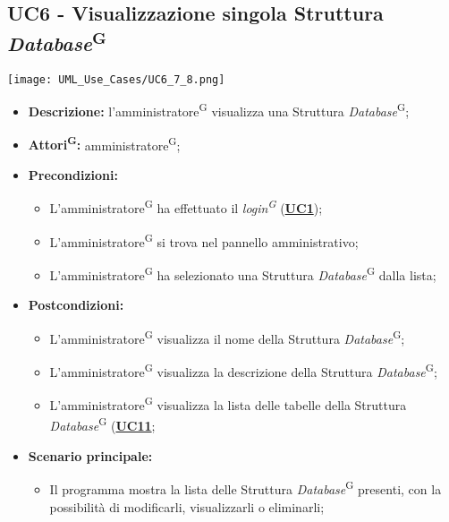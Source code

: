 \subsection{UC6 - Visualizzazione singola Struttura \textit{Database}\textsuperscript{G}}
\label{sec:UC6}
\texttt{[image: UML\_Use\_Cases/UC6\_7\_8.png]}
\begin{itemize}
	\item \textbf{Descrizione:} l’amministratore\textsuperscript{G} visualizza una Struttura \textit{Database}\textsuperscript{G};
	\item \textbf{Attori\textsuperscript{G}:} amministratore\textsuperscript{G};
	\item \textbf{Precondizioni:} 
	\begin{itemize}
		\item L’amministratore\textsuperscript{G} ha effettuato il \textit{login\textsuperscript{G}} (\hyperref[sec:UC1]{\textbf{UC1}});
		\item L’amministratore\textsuperscript{G} si trova nel pannello amministrativo;
		\item L'amministratore\textsuperscript{G} ha selezionato una Struttura \textit{Database}\textsuperscript{G} dalla lista;
	\end{itemize}
	\item \textbf{Postcondizioni:} 
	\begin{itemize}
		\item L'amministratore\textsuperscript{G} visualizza il nome della Struttura \textit{Database}\textsuperscript{G};
		\item L'amministratore\textsuperscript{G} visualizza la descrizione della Struttura \textit{Database}\textsuperscript{G};
		\item L'amministratore\textsuperscript{G} visualizza la lista delle tabelle della Struttura \textit{Database}\textsuperscript{G}  (\hyperref[sec:UC11]{\textbf{UC11}};
	\end{itemize}
	\item \textbf{Scenario principale:} 
	\begin{itemize}
		\item Il programma mostra la lista delle Struttura \textit{Database}\textsuperscript{G} presenti, con la possibilità di modificarli, visualizzarli o eliminarli;
	\end{itemize}
\end{itemize}


